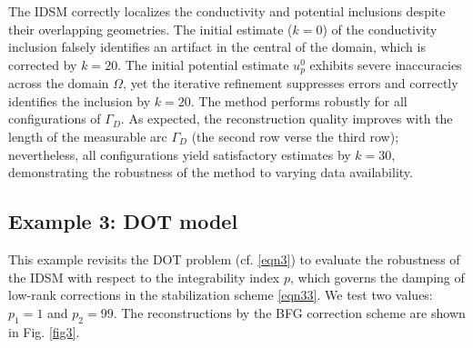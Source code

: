 \documentclass[onefignum,onetabnum]{siamart190516}
\numberwithin{equation}{section}
\begin{document}
The IDSM correctly localizes the conductivity and potential inclusions despite their overlapping geometries.
The initial estimate ($k=0$) of the conductivity inclusion falsely identifies an artifact in the central of the domain, which is corrected by $k=20$.
The initial potential estimate $u_p^0$ exhibits severe inaccuracies across the domain $\Omega$, yet the iterative refinement suppresses errors and correctly identifies the inclusion by $k=20$.
The method performs robustly for all configurations of $\Gamma_D$.
{As expected, the reconstruction quality improves with the length of the measurable arc $\Gamma_D$ (the second row verse the third row); nevertheless, all configurations yield satisfactory estimates by $k=30$, demonstrating the robustness of the method to varying data availability.}

\subsection{Example 3: DOT model}\label{exam3}
{This example revisits the DOT problem (cf. \eqref{eqn3}) to evaluate the robustness of the IDSM with respect to the integrability index $p$, which governs the damping of low-rank corrections in the stabilization scheme \eqref{eqn33}.
We test two values: $p_1 = 1$ and $p_2 = 99$. The reconstructions by the BFG correction scheme are shown in Fig. \ref{fig3}.}
\end{document}
